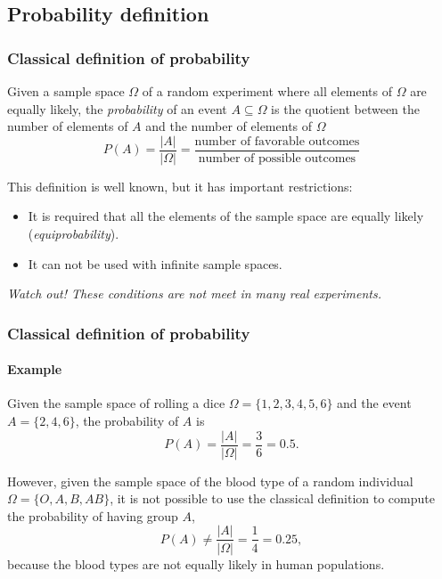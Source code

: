 \subsection{Probability definition}

\begin{frame}
\frametitle{Classical definition of probability}
\begin{definition}
Given a sample space $\Omega$ of a random experiment where all elements of $\Omega$ are equally likely, the
\emph{probability} of an event $A\subseteq \Omega$ is the quotient between the number of elements of $A$ and the number
of elements of $\Omega$
\[ P(A) = \frac{|A|}{|\Omega|} = \frac{\mbox{number of favorable outcomes}}{\mbox{number of possible outcomes}}\]
\end{definition}

This definition is well known, but it has important restrictions:
\begin{itemize}
\item It is required that all the elements of the sample space are equally likely (\emph{equiprobability}).
\item It can not be used with infinite sample spaces.
\end{itemize}

\alert{\emph{Watch out! These conditions are not meet in many real experiments.}}
\end{frame}


\begin{frame}
\frametitle{Classical definition of probability}
\framesubtitle{Example}
Given the sample space of rolling a dice $\Omega=\{1,2,3,4,5,6\}$ and the event $A=\{2,4,6\}$, the probability of $A$ is 
\[
P(A) = \frac{|A|}{|\Omega|} = \frac{3}{6} = 0.5.
\]

However, given the sample space of the blood type of a random individual $\Omega=\{O,A,B,AB\}$, it is not possible to use
the classical definition to compute the probability of having group $A$,
\[
P(A) \neq \frac{|A|}{|\Omega|} = \frac{1}{4} = 0.25,
\]
because the blood types are not equally likely in human populations. 
\end{frame}


